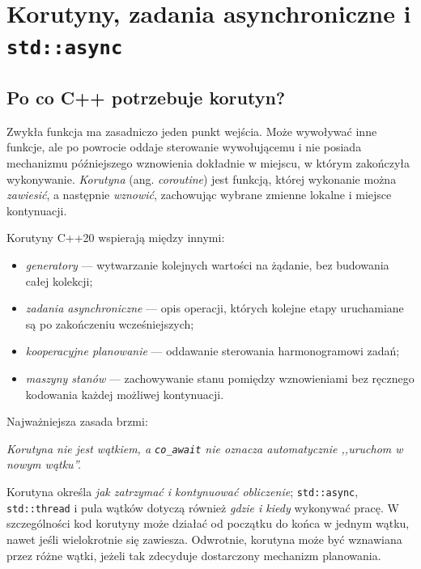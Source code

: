 
\chapter{Korutyny, zadania asynchroniczne i \texttt{std::async}}
\label{chap:cpp15-coroutines}

\section{Po co C++ potrzebuje korutyn?}

Zwykła funkcja ma zasadniczo jeden punkt wejścia. Może wywoływać inne
funkcje, ale po powrocie oddaje sterowanie wywołującemu i nie posiada
mechanizmu późniejszego wznowienia dokładnie w miejscu, w którym
zakończyła wykonywanie. \emph{Korutyna} (ang. \emph{coroutine}) jest
funkcją, której wykonanie można \emph{zawiesić}, a następnie
\emph{wznowić}, zachowując wybrane zmienne lokalne i miejsce kontynuacji.

Korutyny C++20 wspierają między innymi:
\begin{itemize}
\item \emph{generatory} --- wytwarzanie kolejnych wartości na żądanie,
      bez budowania całej kolekcji;
\item \emph{zadania asynchroniczne} --- opis operacji, których kolejne
      etapy uruchamiane są po zakończeniu wcześniejszych;
\item \emph{kooperacyjne planowanie} --- oddawanie sterowania
      harmonogramowi zadań;
\item \emph{maszyny stanów} --- zachowywanie stanu pomiędzy wznowieniami
      bez ręcznego kodowania każdej możliwej kontynuacji.
\end{itemize}

Najważniejsza zasada brzmi:
\begin{center}
\emph{Korutyna nie jest wątkiem, a \texttt{co\_await} nie oznacza
automatycznie ,,uruchom w nowym wątku''.}
\end{center}

Korutyna określa \emph{jak zatrzymać i kontynuować obliczenie};
\texttt{std::async}, \texttt{std::thread} i pula wątków dotyczą również
\emph{gdzie i kiedy} wykonywać pracę. W szczególności kod korutyny
może działać od początku do końca w jednym wątku, nawet jeśli
wielokrotnie się zawiesza. Odwrotnie, korutyna może być wznawiana
przez różne wątki, jeżeli tak zdecyduje dostarczony mechanizm planowania.

